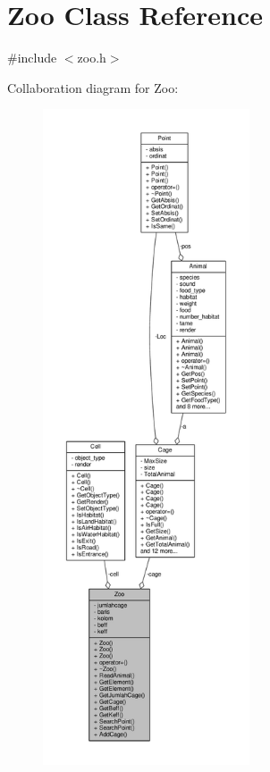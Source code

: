 \hypertarget{classZoo}{}\section{Zoo Class Reference}
\label{classZoo}


{\ttfamily \#include $<$zoo.\+h$>$}



Collaboration diagram for Zoo\+:
\nopagebreak
\begin{figure}[H]
\begin{center}
\leavevmode
\includegraphics[height=550pt]{classZoo__coll__graph}
\end{center}
\end{figure}
